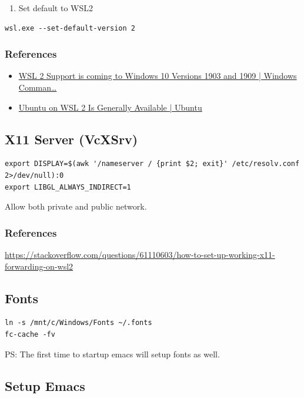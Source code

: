 \documentclass[11pt]{article}
\begin{document}
\begin{enumerate}
\item Set default to WSL2
\end{enumerate}
\begin{verbatim}
wsl.exe --set-default-version 2
\end{verbatim}

\subsubsection{References}
\label{sec:org55af546}
\begin{itemize}
\item \href{https://devblogs.microsoft.com/commandline/wsl-2-support-is-coming-to-windows-10-versions-1903-and-1909/}{WSL 2 Support is coming to Windows 10 Versions 1903 and 1909 | Windows Comman\ldots{}}
\item \href{https://ubuntu.com/blog/ubuntu-on-wsl-2-is-generally-available}{Ubuntu on WSL 2 Is Generally Available | Ubuntu}
\end{itemize}

\subsection{X11 Server (VcXSrv)}
\label{sec:orgd6664c1}
\begin{verbatim}
export DISPLAY=$(awk '/nameserver / {print $2; exit}' /etc/resolv.conf 2>/dev/null):0
export LIBGL_ALWAYS_INDIRECT=1
\end{verbatim}
Allow both private and public network.
\subsubsection{References}
\label{sec:org71efb84}
\url{https://stackoverflow.com/questions/61110603/how-to-set-up-working-x11-forwarding-on-wsl2}

\subsection{Fonts}
\label{sec:orga5565b4}
\begin{verbatim}
ln -s /mnt/c/Windows/Fonts ~/.fonts
fc-cache -fv
\end{verbatim}
PS: The first time to startup emacs will setup fonts as well.

\subsection{Setup Emacs}
\label{sec:orge509d9d}
\end{document}
